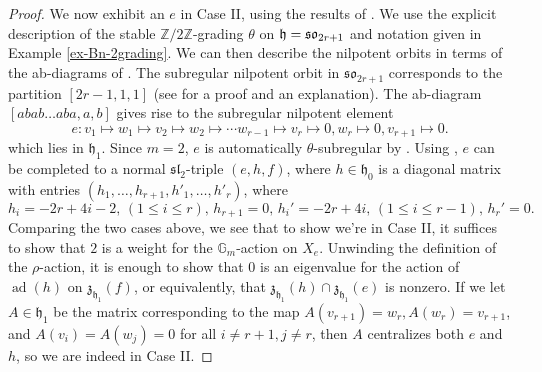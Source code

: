 \documentclass{article} %
\numberwithin{equation}{section}
\theoremstyle{definition}
\newcommand{\Z}{\mathbb{Z}}
\newcommand{\frakh}{\mathfrak h}
\newcommand{\frakz}{\mathfrak z}
\newcommand{\fraksl}{\mathfrak{sl}}
\DeclareMathOperator{\ad}{ad}
\newcommand{\rl}{r} %
\begin{document}
\begin{proof}
    We now exhibit an $e$ in Case II, using the results of \cite{Ohta-classificationadmissiblenilpotent}.
    We use the explicit description of the stable $\Z/2\Z$-grading $\theta$ on $\frakh = \frak{so}_{2\rl+1}$ and notation given in Example \ref{ex-Bn-2grading}. 
    We can then describe the nilpotent orbits in terms of the ab-diagrams of \cite[p. 305, Proposition 2]{Ohta-classificationadmissiblenilpotent}.
    The subregular nilpotent orbit in $\mathfrak{so}_{2\rl + 1}$ corresponds to the partition $[2\rl-1,1,1]$ (see \cite[Sections 5.1 and 5.4]{CollingwoodMcGovern-nilpotentorbits} for a proof and an explanation). 
    The ab-diagram $[abab\dots aba,a,b]$ gives rise to the subregular nilpotent element 
\[
e: v_1\mapsto w_1\mapsto v_2 \mapsto w_2 \mapsto \cdots w_{\rl-1}\mapsto v_{\rl}\mapsto 0, w_\rl\mapsto 0, v_{\rl+1}\mapsto 0.
\]
which lies in $\frakh_1$.
Since $m=2$, $e$ is automatically $\theta$-subregular by \cite[Lemma 2.21]{Thorne-thesis}.
Using \cite[Case (BDI) of Section (4.2) and Section (3.1), Lemma 4]{Ohta-classificationadmissiblenilpotent}, $e$ can be completed to a normal $\fraksl_2$-triple $(e,h,f)$, where $h \in \frakh_0$ is a diagonal matrix with entries $(h_1, \dots, h_{\rl+1}, h'_1, \dots, h'_\rl)$, where
\[
h_i = -2\rl+4i-2, \, (1\leq i\leq \rl), \, h_{\rl+1}=0, \, h_i' =-2\rl+4i , \, (1\leq i \leq \rl-1), \,h_\rl' = 0.
\]
Comparing the two cases above, we see that to show we're in Case II, it suffices to show that $2$ is a weight for the $\mathbb{G}_m$-action on $X_e$.
Unwinding the definition of the $\rho$-action, it is enough to show that $0$ is an eigenvalue for the action of $\ad(h)$ on $\frakz_{\frakh_1}(f)$, or equivalently, that $\frakz_{\frakh_1}(h) \cap \frakz_{\frakh_1}(e)$ is nonzero. If we let $A \in \frakh_1$ be the matrix corresponding to the map $A(v_{\rl + 1}) = w_\rl, A(w_\rl) = v_{\rl + 1}$, and $A(v_i) = A(w_j) = 0$ for all $i \neq \rl + 1, j \neq \rl$, then $A$ centralizes both $e$ and $h$, so we are indeed in Case II. 
\end{proof}
\end{document}
